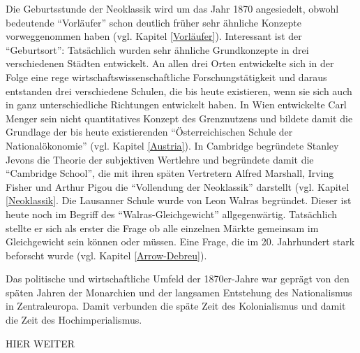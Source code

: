 Die Geburtsstunde der Neoklassik wird um das Jahr 1870 angesiedelt, obwohl bedeutende "`Vorläufer"' schon deutlich früher sehr ähnliche Konzepte vorweggenommen haben (vgl. Kapitel \ref{Vorläufer}). Interessant ist der "`Geburtsort"': Tatsächlich wurden sehr ähnliche Grundkonzepte in drei verschiedenen Städten entwickelt. An allen drei Orten entwickelte sich in der Folge eine rege wirtschaftswissenschaftliche Forschungstätigkeit und daraus entstanden drei verschiedene Schulen, die bis heute existieren, wenn sie sich auch in ganz unterschiedliche Richtungen entwickelt haben. In Wien entwickelte Carl Menger sein nicht quantitatives Konzept des Grenznutzens und bildete damit die Grundlage der bis heute existierenden "`Österreichischen Schule der Nationalökonomie"' (vgl. Kapitel \ref{Austria}). In Cambridge begründete Stanley Jevons die Theorie der subjektiven Wertlehre und begründete damit die "`Cambridge School"', die mit ihren späten Vertretern Alfred Marshall, Irving Fisher und Arthur Pigou die "`Vollendung der Neoklassik"' darstellt (vgl. Kapitel \ref{Neoklassik}. Die Lausanner Schule wurde von Leon Walras begründet. Dieser ist heute noch im Begriff des "`Walras-Gleichgewicht"' allgegenwärtig. Tatsächlich stellte er sich als erster die Frage ob alle einzelnen Märkte gemeinsam im Gleichgewicht sein können oder müssen. Eine Frage, die im 20. Jahrhundert stark beforscht wurde (vgl. Kapitel \ref{Arrow-Debreu}).

Das politische und wirtschaftliche Umfeld der 1870er-Jahre war geprägt von den späten Jahren der Monarchien und der langsamen Entstehung des Nationalismus in Zentraleuropa. Damit verbunden die späte Zeit des Kolonialismus und damit die Zeit des Hochimperialismus. 

HIER WEITER


